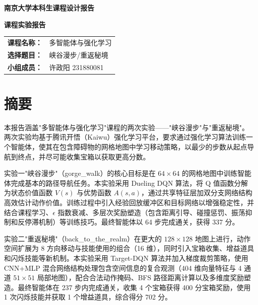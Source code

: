 \documentclass[12pt,a4paper]{article}
\begin{document}
\begin{titlepage}
\centering
\vspace*{4cm}
{\Huge\bfseries\sffamily 南京大学本科生课程设计报告 \par}
\vspace{1.5cm}
{\LARGE\bfseries 课程实验报告 \par}
\vspace{2cm}
{\Large
\begin{tabular}{rl}
\textbf{课程名称：} & 多智能体与强化学习 \\[6pt]
\textbf{选择题目：} & 峡谷漫步\;/\;重返秘境 \\[6pt]
\textbf{小组成员：} & 许政阳 231880081 \\
\end{tabular}
\par}
\vfill
\end{titlepage}

\tableofcontents
\newpage

\section{摘要}

本报告涵盖"多智能体与强化学习"课程的两次实验——"峡谷漫步"与"重返秘境"。两次实验均基于腾讯开悟（Kaiwu）强化学习平台，要求通过强化学习算法训练一个智能体，使其在包含障碍物的网格地图中学习移动策略，以最少的步数从起点导航到终点，并尽可能收集宝箱以获取更高分数。

实验一"峡谷漫步"（gorge\_walk）的核心目标是在 $64\times64$ 的网格地图中训练智能体完成基本的路径导航任务。本实验采用 Dueling DQN 算法，将 Q 值函数分解为状态价值函数 $V(s)$ 与优势函数 $A(s,a)$，通过共享特征层加双分支网络结构高效估计动作价值。训练过程中引入经验回放缓冲区和目标网络以增强稳定性，并结合课程学习、$\epsilon$ 指数衰减、多层次奖励塑造（包含距离引导、碰撞惩罚、振荡抑制和反停滞机制）等训练技巧。最终智能体以 64 步完成通关，获得 337 分。

实验二"重返秘境"（back\_to\_the\_realm）在更大的 $128\times128$ 地图上进行，动作空间扩展为 8 方向移动与技能使用的组合（16 维），同时引入宝箱收集、增益道具和闪烁技能等新机制。本实验采用 Target-DQN 算法并加入梯度裁剪策略，使用 CNN+MLP 混合网络结构处理包含空间信息的复合观测（404 维向量特征与 4 通道 $51\times51$ 局部地图），配合合法动作掩码、BFS 路径距离计算以及多维度奖励塑造。最终智能体在 237 步内完成通关，收集 4 个宝箱获得 400 分宝箱奖励，使用 1 次闪烁技能并获取 1 个增益道具，综合得分 702 分。
\end{document}

